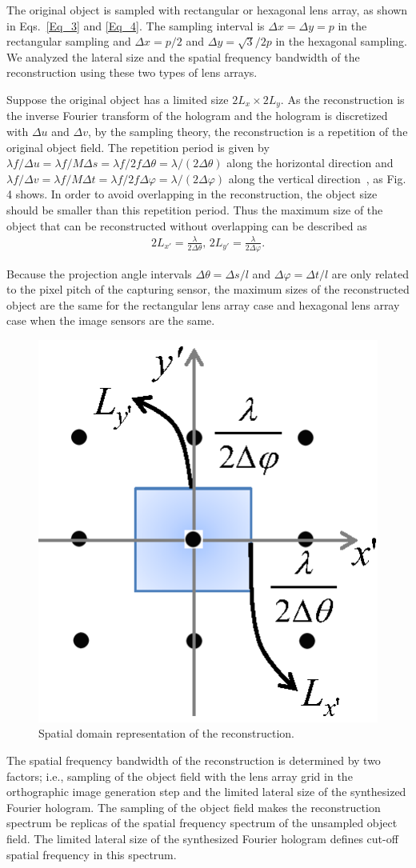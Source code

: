 \documentclass[10pt,letterpaper]{article}
\begin{document}
The original object is sampled with rectangular or hexagonal lens array, as shown in Eqs.~\eqref{Eq_3} and \eqref{Eq_4}. The sampling interval is $\Delta x= \Delta y=p$ in the rectangular sampling and $\Delta x= p/2$ and $\Delta y=\sqrt{3}/2p$ in the hexagonal sampling. We analyzed the lateral size and the spatial frequency bandwidth of the reconstruction using these two types of lens arrays.  

Suppose the original object has a limited size $2L_x\times 2L_y$. As the reconstruction is the inverse Fourier transform of the hologram and the hologram is discretized with $\Delta u$ and $\Delta v$, by the sampling theory, the reconstruction is a repetition of the original object field. The repetition period is given by $\lambda f/\Delta u= \lambda f/M\Delta s= \lambda f/2f\Delta\theta = \lambda/(2\Delta\theta)$ along the horizontal direction and $\lambda f/\Delta v= \lambda f/M\Delta t= \lambda f/2f\Delta\varphi= \lambda/(2\Delta\varphi)$ along the vertical direction~\cite{Goodman_2005}, as Fig. 4 shows. In order to avoid overlapping in the reconstruction, the object size should be smaller than this repetition period. Thus the maximum size of the object that can be reconstructed without overlapping can be described as  
\begin{align}
2L_{x'} =\frac{\lambda}{2\Delta\theta} ,\, 2L_{y'} =\frac{\lambda}{2\Delta\varphi}. 
\label{Eq_5} 
\end{align} 

Because the projection angle intervals $\Delta\theta=\Delta s/l$ and $\Delta\varphi=\Delta t/l$ are only related to the pixel pitch of the capturing sensor, the maximum sizes of the reconstructed object are the same for the rectangular lens array case and hexagonal lens array case when the image sensors are the same.
\begin{figure}[htb]
\centering\includegraphics[width=.25\columnwidth]{fig_4}
\caption{Spatial domain representation of the reconstruction.}
\label{fig_4}
\end{figure}

The spatial frequency bandwidth of the reconstruction is determined by two factors; i.e., sampling of the object field with the lens array grid in the orthographic image generation step and the limited lateral size of the synthesized Fourier hologram. The sampling of the object field makes the reconstruction spectrum be replicas of the spatial frequency spectrum of the unsampled object field. The limited lateral size of the synthesized Fourier hologram defines cut-off spatial frequency in this spectrum.  
\end{document}
